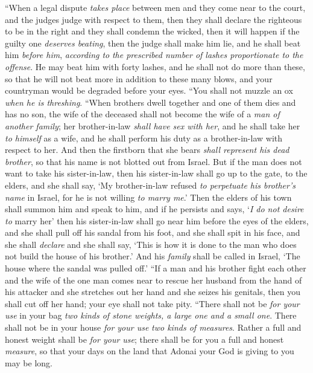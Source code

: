 \begin{biblechapter} %
\verse “When a legal dispute \textit{takes place} between men and they come near to the court, and the judges judge with respect to them, then they shall declare the righteous to be in the right and they shall condemn the wicked,
\verse then it will happen if the guilty one \textit{deserves beating}, then the judge shall make him lie, and he shall beat him \textit{before him}, \textit{according to} \textit{the prescribed number of lashes proportionate to the offense}.
\verse He may beat him with forty lashes, and he shall not do more than these, so that he will not beat more in addition to these many blows, and your countryman would be degraded before your eyes.
\verse “You shall not muzzle an ox \textit{when he is threshing}.
\verse “When brothers dwell together and one of them dies and has no son, the wife of the deceased shall not become the wife of a \textit{man of another family}; her brother-in-law \textit{shall have sex with her}, and he shall take her \textit{to himself} as a wife, and he shall perform his duty as a brother-in-law with respect to her.
\verse And then the firstborn that she bears \textit{shall represent his dead brother}, so that his name is not blotted out from Israel.
\verse But if the man does not want to take his sister-in-law, then his sister-in-law shall go up to the gate, to the elders, and she shall say, ‘My brother-in-law refused \textit{to perpetuate his brother’s name} in Israel, for he is not willing \textit{to marry me}.’
\verse Then the elders of his town shall summon him and speak to him, and if he persists and says, ‘\textit{I do not desire to} marry her’
\verse then his sister-in-law shall go near him before the eyes of the elders, and she shall pull off his sandal from his foot, and she shall spit in his face, and she shall \textit{declare} and she shall say, ‘This is how it is done to the man who does not build the house of his brother.’
\verse And his \textit{family} shall be called in Israel, ‘The house where the sandal was pulled off.’
\verse “If a man and his brother fight each other and the wife of the one man comes near to rescue her husband from the hand of his attacker and she stretches out her hand and she seizes his genitals,
\verse then you shall cut off her hand; your eye shall not take pity.
\verse “There shall not be \textit{for your use} in your bag \textit{two kinds of stone weights, a large one and a small one}.
\verse There shall not be in your house \textit{for your use} \textit{two kinds of measures}.
\verse Rather a full and honest weight shall be \textit{for your use}; there shall be for you a full and honest \textit{measure}, so that your days on the land that Adonai your God is giving to you may be long.

\end{biblechapter}
